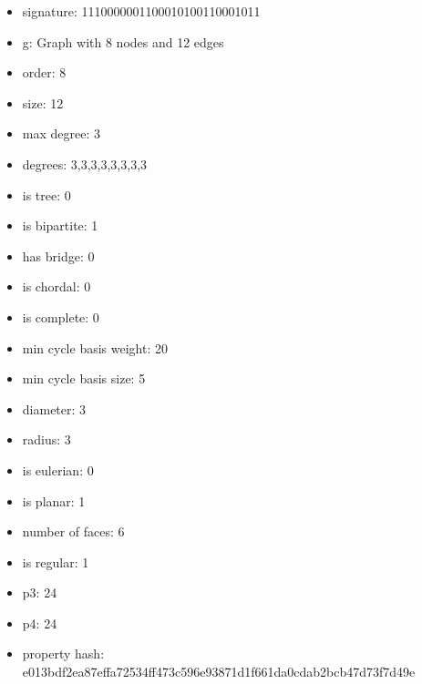 \begin{itemize}
\item signature: 1110000001100010100110001011
\item g: Graph with 8 nodes and 12 edges
\item order: 8
\item size: 12
\item max degree: 3
\item degrees: 3,3,3,3,3,3,3,3
\item is tree: 0
\item is bipartite: 1
\item has bridge: 0
\item is chordal: 0
\item is complete: 0
\item min cycle basis weight: 20
\item min cycle basis size: 5
\item diameter: 3
\item radius: 3
\item is eulerian: 0
\item is planar: 1
\item number of faces: 6
\item is regular: 1
\item p3: 24
\item p4: 24
\item property hash: e013bdf2ea87effa72534ff473c596e93871d1f661da0cdab2bcb47d73f7d49e
\end{itemize}
\newpage
\begin{figure}
\end{figure}
